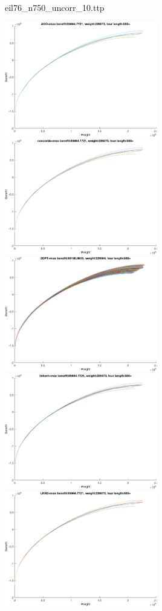 \documentclass{article}
\begin{document}
\newpage
eil76\_n750\_uncorr\_10.ttp

\noindent
\includegraphics[width=0.5\textwidth]{eil76figs/eil76_n750_uncorr_10.ttp.aco.txt.eps}
\includegraphics[width=0.5\textwidth]{eil76figs/eil76_n750_uncorr_10.ttp.con.txt.eps}
\includegraphics[width=0.5\textwidth]{eil76figs/eil76_n750_uncorr_10.ttp.inv.txt.eps}
\includegraphics[width=0.5\textwidth]{eil76figs/eil76_n750_uncorr_10.ttp.lkh.txt.eps}
\includegraphics[width=0.5\textwidth]{eil76figs/eil76_n750_uncorr_10.ttp.lkh2.txt.eps}
\end{document}
